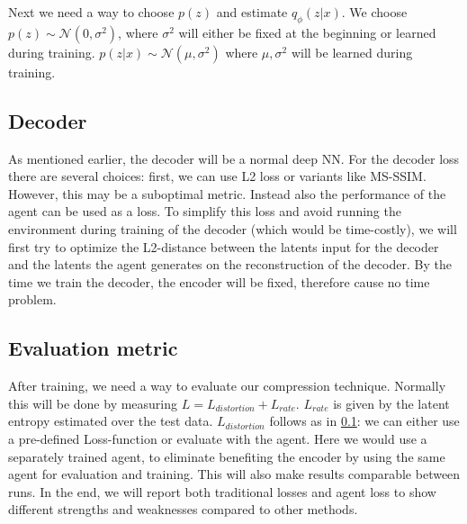 \documentclass[a4paper]{scrartcl}
\begin{document}
        Next we need a way to choose $p(z)$ and estimate $q_\phi (z\vert x)$.
        We choose $p(z) \sim \mathcal{N}(0, \sigma^2)$, where $\sigma^2$ will
        either be fixed at the beginning or learned during training. $p(z
        \vert x) \sim \mathcal{N}(\mu , \sigma^2)$ where $\mu, \sigma^2$ will be
        learned during training.

    \subsection{Decoder}\label{methods:Decoder}
        As mentioned earlier, the decoder will be a normal deep NN. For the decoder loss there are several
        choices: first, we can use L2 loss or variants like MS-SSIM. However, this may be a suboptimal metric. Instead
        also the performance of the agent can be used as a loss. To simplify
        this loss and avoid running the environment during training of the
        decoder (which would be time-costly), we will first try to optimize the L2-distance between the latents input for
        the decoder and the latents the agent generates on the reconstruction of
        the decoder. By the time we train the decoder, the encoder will
        be fixed, therefore cause no time problem.

    \subsection{Evaluation metric}
        After training, we need a way to evaluate our compression technique.
        Normally this will be done by measuring $L = L_{distortion} + L_{rate}$.
        $L_{rate}$ is given by the latent entropy estimated over
        the test data. $L_{distortion}$ follows as in
        \ref{methods:Decoder}: we can either use a pre-defined Loss-function or evaluate with
        the agent. Here we would use a separately trained agent,
        to eliminate benefiting the encoder by using the same
        agent for evaluation and training. This will also make results
        comparable between runs. In the end, we will report both traditional
        losses and agent loss to show different strengths and weaknesses
        compared to other methods. 
        
\end{document}
